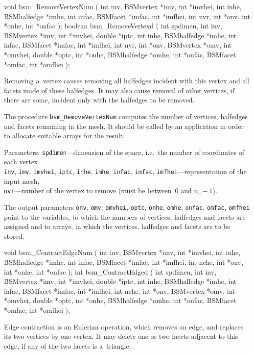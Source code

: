 \medskip
\begin{listingC}
void bsm_RemoveVertexNum ( int inv, BSMvertex *imv, int *imvhei,
                           int inhe, BSMhalfedge *imhe,
                           int infac, BSMfacet *imfac, int *imfhei,
                           int nvr,
                           int *onv, int *onhe, int *onfac );
boolean bsm_RemoveVertexd ( int spdimen,
                int inv, BSMvertex *imv, int *imvhei, double *iptc,
                int inhe, BSMhalfedge *imhe,
                int infac, BSMfacet *imfac, int *imfhei,
                int nvr,
                int *onv, BSMvertex *omv, int *omvhei, double *optc,
                int *onhe, BSMhalfedge *omhe,
                int *onfac, BSMfacet *omfac, int *omfhei );
\end{listingC}
Removing a~vertex causes removing all halfedges incident with this vertex
and all facets made of these halfedges. It may also cause removal of other
vertices, if there are some, incident only with the halfedges to be removed.

The procedure \texttt{bsm\_RemoveVertexNum} computes the number of vertices,
halfedges and facets remaining in the mesh. It should be called by an
application in order to allocate suitable arrays for the result.

Parameters: \texttt{spdimen}---dimension of the space, i.e.\ the number of
coordinates of each vertex. \\
\texttt{inv}, \texttt{imv}, \texttt{imvhei}, \texttt{iptc}, \texttt{inhe},
\texttt{imhe}, \texttt{infac}, \texttt{imfac},
\texttt{imfhei}---representation of the input mesh, \\
\texttt{nvr}---number of the vertex to remove
(must be between~$0$ and $n_v-1$).

The output parameters \texttt{onv}, \texttt{omv}, \texttt{omvhei},
\texttt{optc}, \texttt{onhe}, \texttt{omhe}, \texttt{onfac}, \texttt{omfac},
\texttt{omfhei} point to the variables, to which the numbers of vertices,
halfedges and facets are assigned and to arrays, in which the vertices,
halfedges and facets are to be stored.

\medskip
\begin{listingC}
void bsm_ContractEdgeNum ( int inv, BSMvertex *imv, int *imvhei,
                           int inhe, BSMhalfedge *imhe,
                           int infac, BSMfacet *imfac, int *imfhei,
                           int nche,
                           int *onv, int *onhe, int *onfac );
int bsm_ContractEdged ( int spdimen,
                int inv, BSMvertex *imv, int *imvhei, double *iptc,
                int inhe, BSMhalfedge *imhe,
                int infac, BSMfacet *imfac, int *imfhei,
                int nche,
                int *onv, BSMvertex *omv, int *omvhei, double *optc,
                int *onhe, BSMhalfedge *omhe,
                int *onfac, BSMfacet *omfac, int *omfhei );
\end{listingC}
Edge contraction is an Eulerian operation, which removes an edge, and
replaces its two vertices by one vertex. It may delete one or two facets
adjacent to this edge, if any of the two facets is a~triangle.

